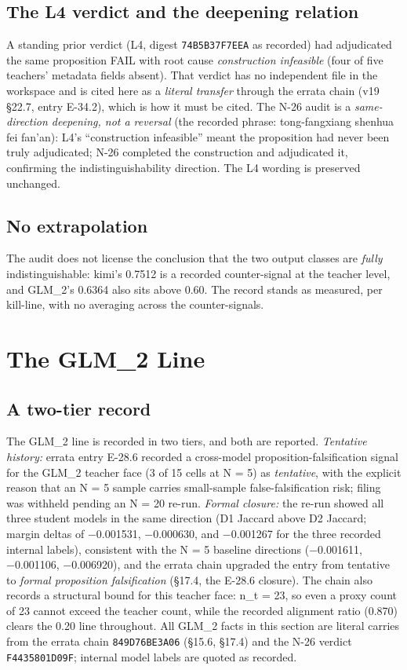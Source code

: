 \documentclass[11pt]{article}
\newcommand{\sha}[1]{\texttt{#1}}
\begin{document}
\subsection{The L4 verdict and the deepening relation}
\noindent A standing prior verdict (L4, digest \sha{74B5B37F7EEA} as recorded) had adjudicated the same proposition FAIL with root cause \emph{construction infeasible} (four of five teachers' metadata fields absent). That verdict has no independent file in the workspace and is cited here as a \emph{literal transfer} through the errata chain (v19 §22.7, entry E-34.2), which is how it must be cited. The N-26 audit is a \emph{same-direction deepening, not a reversal} (the recorded phrase: tong-fangxiang shenhua fei fan'an): L4's ``construction infeasible'' meant the proposition had never been truly adjudicated; N-26 completed the construction and adjudicated it, confirming the indistinguishability direction. The L4 wording is preserved unchanged.\par
\subsection{No extrapolation}
\noindent The audit does not license the conclusion that the two output classes are \emph{fully} indistinguishable: kimi's 0.7512 is a recorded counter-signal at the teacher level, and GLM\_2's 0.6364 also sits above 0.60. The record stands as measured, per kill-line, with no averaging across the counter-signals.\par
\section{The GLM\_2 Line}
\label{sec:15}
\subsection{A two-tier record}
\noindent The GLM\_2 line is recorded in two tiers, and both are reported. \emph{Tentative history:} errata entry E-28.6 recorded a cross-model proposition-falsification signal for the GLM\_2 teacher face (3 of 15 cells at N = 5) as \emph{tentative}, with the explicit reason that an N = 5 sample carries small-sample false-falsification risk; filing was withheld pending an N = 20 re-run. \emph{Formal closure:} the re-run showed all three student models in the same direction (D1 Jaccard above D2 Jaccard; margin deltas of −0.001531, −0.000630, and −0.001267 for the three recorded internal labels), consistent with the N = 5 baseline directions (−0.001611, −0.001106, −0.006920), and the errata chain upgraded the entry from tentative to \emph{formal proposition falsification} (§17.4, the E-28.6 closure). The chain also records a structural bound for this teacher face: n\_t = 23, so even a proxy count of 23 cannot exceed the teacher count, while the recorded alignment ratio (0.870) clears the 0.20 line throughout. All GLM\_2 facts in this section are literal carries from the errata chain \sha{849D76BE3A06} (§15.6, §17.4) and the N-26 verdict \sha{F4435801D09F}; internal model labels are quoted as recorded.\par
\end{document}

